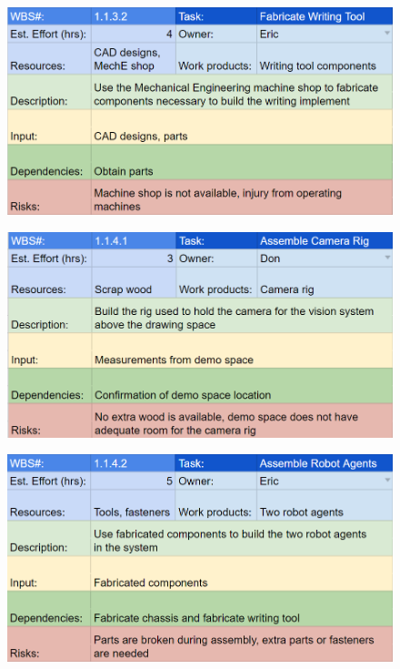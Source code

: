 \begin{figure}[!ht]
\centering
\includegraphics[width=0.98\columnwidth]{wbs_schedule/wbs_dict_hw4.PNG}
\label{fig:hw4}
\end{figure}
\begin{figure}[!ht]
\centering
\includegraphics[width=0.98\columnwidth]{wbs_schedule/wbs_dict_hw5.PNG}
\label{fig:hw5}
\end{figure}
\begin{figure}[!ht]
\centering
\includegraphics[width=0.98\columnwidth]{wbs_schedule/wbs_dict_hw6.PNG}
\label{fig:hw6}
\end{figure}
